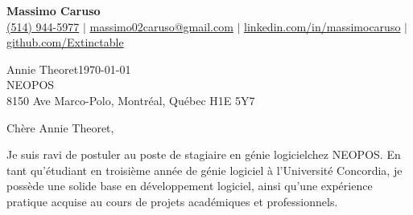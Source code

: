 \documentclass[10pt]{article}
\begin{document}
\newcommand{\fullname}{Massimo Caruso}
\newcommand{\phone}{(514) 944-5977}
\newcommand{\email}{massimo02caruso@gmail.com}
\newcommand{\linkedin}{linkedin.com/in/massimocaruso}
\newcommand{\github}{github.com/Extinctable}

\newcommand*{\hiringManager}{Annie Theoret}
\newcommand*{\company}{NEOPOS}
\newcommand*{\address}{8150 Ave Marco-Polo, Montréal, Québec H1E 5Y7}

\newcommand*{\position}{stagiaire en génie logiciel}
\newcommand*{\companyDetails}{son accent sur des solutions innovantes, fiables et efficaces de systèmes POS qui permettent aux entreprises d'optimiser leurs opérations et d'améliorer l'expérience client}
\newcommand*{\positionDetails}{contribuer au développement de logiciels de pointe pour les systèmes POS, en utilisant mes compétences pour créer des solutions évolutives et conviviales}

\begin{center}
    {\Huge \textbf{\fullname}} \\
    \vspace{1mm}
    {\small 
    \faPhone \hspace{0mm} \href{tel:+15149445977}{\phone} $\vert$ 
    \faEnvelope \hspace{0mm} \href{mailto:massimo02caruso@gmail.com}{\email} $\vert$ 
    \faLinkedin \hspace{0mm} \href{https://linkedin.com/in/massimocaruso}{\linkedin} $\vert$ 
    \faGithub \hspace{0mm} \href{https://github.com/Extinctable}{\github}
    }
\end{center}

\vspace{1.5em}
\hiringManager \hfill \today \\
\company \\
\address

\vspace{1.5em}
Chère \hiringManager,

Je suis ravi de postuler au poste de \position \space chez \company. En tant qu'étudiant en troisième année de génie logiciel à l'Université Concordia, je possède une solide base en développement logiciel, ainsi qu'une expérience pratique acquise au cours de projets académiques et professionnels.
\end{document}
